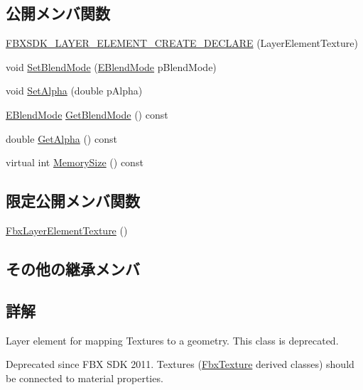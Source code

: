 \subsection*{公開メンバ関数}
\begin{DoxyCompactItemize}
\item 
\hyperlink{class_fbx_layer_element_texture_ac69127663d69ccfdfdba998e541ad830}{F\+B\+X\+S\+D\+K\+\_\+\+L\+A\+Y\+E\+R\+\_\+\+E\+L\+E\+M\+E\+N\+T\+\_\+\+C\+R\+E\+A\+T\+E\+\_\+\+D\+E\+C\+L\+A\+RE} (Layer\+Element\+Texture)
\item 
void \hyperlink{class_fbx_layer_element_texture_ac10e1c4ab20077c963b8d097f867ee53}{Set\+Blend\+Mode} (\hyperlink{class_fbx_layer_element_texture_a95d9277da243733eae14d4d0141f77ea}{E\+Blend\+Mode} p\+Blend\+Mode)
\item 
void \hyperlink{class_fbx_layer_element_texture_a775988b21edfe6a084e306d5f67fd1e8}{Set\+Alpha} (double p\+Alpha)
\item 
\hyperlink{class_fbx_layer_element_texture_a95d9277da243733eae14d4d0141f77ea}{E\+Blend\+Mode} \hyperlink{class_fbx_layer_element_texture_aa4ddd6daddc1785bb6ccf579545b5ff3}{Get\+Blend\+Mode} () const
\item 
double \hyperlink{class_fbx_layer_element_texture_a3177d951ed3d562d6502c624af638488}{Get\+Alpha} () const
\item 
virtual int \hyperlink{class_fbx_layer_element_texture_aa6ee4c7c56a71d1a3f70fa4e0806e1f5}{Memory\+Size} () const
\end{DoxyCompactItemize}
\subsection*{限定公開メンバ関数}
\begin{DoxyCompactItemize}
\item 
\hyperlink{class_fbx_layer_element_texture_a3d75a98947f6c50b46af1d190aafd39d}{Fbx\+Layer\+Element\+Texture} ()
\end{DoxyCompactItemize}
\subsection*{その他の継承メンバ}


\subsection{詳解}
Layer element for mapping Textures to a geometry. This class is deprecated. 

Deprecated since F\+BX S\+DK 2011. Textures (\hyperlink{class_fbx_texture}{Fbx\+Texture} derived classes) should be connected to material properties.

